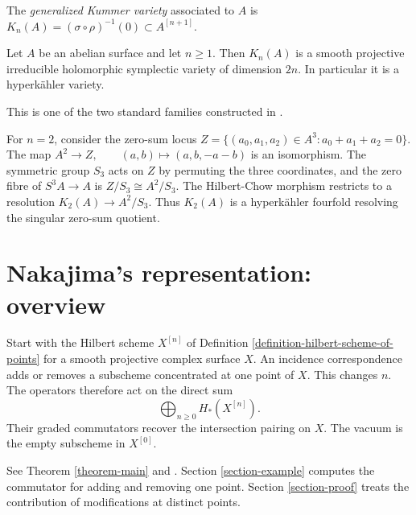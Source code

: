 \begin{definition}
\label{definition-generalized-kummer}
The {\it generalized Kummer variety}
associated to $A$ is
$
K_n(A)
=
(\sigma\circ\rho)^{-1}(0)
\subset A^{[n+1]}.
$
\end{definition}

\begin{theorem}[Beauville]
\label{theorem-generalized-kummer-hk}
Let $A$ be an abelian surface and let
$n\geq1$. Then $K_n(A)$ is a smooth
projective irreducible holomorphic symplectic
variety of dimension $2n$. In particular it
is a hyperk\"ahler variety.
\end{theorem}

\begin{reference}
This is one of the two standard families
constructed in \cite{beauville-kummer}.
\end{reference}

\begin{example}
\label{example-kummer-fourfold}
For $n=2$, consider the zero-sum locus
$
Z=
\{(a_0,a_1,a_2)\in A^3:
a_0+a_1+a_2=0\}.
$
The map
$
A^2\longrightarrow Z,
\qquad
(a,b)\longmapsto(a,b,-a-b)
$
is an isomorphism. The symmetric group
$S_3$ acts on $Z$ by permuting the three
coordinates, and the zero fibre of
$
S^3A\longrightarrow A
$
is
$
Z/S_3\cong A^2/S_3.
$
The Hilbert-Chow morphism restricts to a
resolution
$
K_2(A)\longrightarrow A^2/S_3.
$
Thus $K_2(A)$ is a hyperk\"ahler fourfold
resolving the singular zero-sum quotient.
\end{example}

\section{Nakajima's representation: overview}
\label{section-intro}

\begin{remark}
\label{section-abs}
Start with the Hilbert scheme $X^{[n]}$ of
Definition
\ref{definition-hilbert-scheme-of-points}
for a smooth projective complex surface $X$.
An incidence correspondence adds or removes
a subscheme concentrated at one point of
$X$. This changes $n$. The operators
therefore act on the direct sum
$$
\bigoplus_{n\geq 0} H_*(X^{[n]}).
$$
Their graded commutators recover the
intersection pairing on $X$. The vacuum
is the empty subscheme in $X^{[0]}$.
\end{remark}

See Theorem \ref{theorem-main} and
\cite[Chapter 8]{Nakajima-lectures}.
Section \ref{section-example} computes the
commutator for adding and removing one
point. Section \ref{section-proof} treats
the contribution of modifications at
distinct points.

